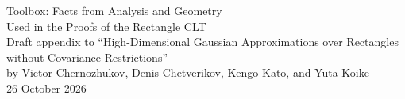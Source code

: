 \documentclass[11pt,letterpaper]{article}
\theoremstyle{plain}
\begin{document}
\begin{center}
{\Large Toolbox: Facts from Analysis and Geometry\\[0.15em]
Used in the Proofs of the Rectangle CLT}\\[0.85em]
{\normalsize Draft appendix to ``High-Dimensional Gaussian Approximations over
Rectangles without Covariance Restrictions''\\
by Victor Chernozhukov, Denis Chetverikov, Kengo Kato, and Yuta Koike}\\[0.65em]
{\normalsize 26 October 2026}
\end{center}
\bigskip

\appendix
\setcounter{section}{5}

\end{document}
